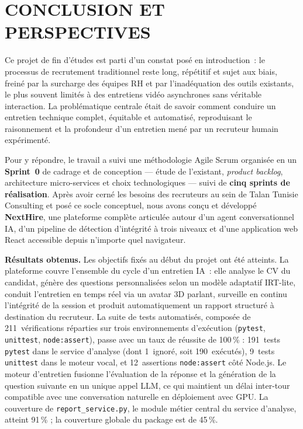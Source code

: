 \chapter*{CONCLUSION ET PERSPECTIVES}
\adjustmtc%
\thispagestyle{MyStyle}

Ce projet de fin d'études est parti d'un constat posé en introduction~: le processus de
recrutement traditionnel reste long, répétitif et sujet aux biais, freiné par la surcharge
des équipes RH et par l'inadéquation des outils existants, le plus souvent limités à des
entretiens vidéo asynchrones sans véritable interaction. La problématique centrale était de
savoir comment conduire un entretien technique complet, équitable et automatisé, reproduisant
le raisonnement et la profondeur d'un entretien mené par un recruteur humain expérimenté.

Pour y répondre, le travail a suivi une méthodologie Agile Scrum organisée en un \textbf{Sprint~0}
de cadrage et de conception --- étude de l'existant, \textit{product backlog}, architecture
micro-services et choix technologiques --- suivi de \textbf{cinq sprints de réalisation}. Après
avoir cerné les besoins des recruteurs au sein de Talan Tunisie Consulting et posé ce socle
conceptuel, nous avons conçu et développé \textbf{NextHire}, une plateforme complète articulée
autour d'un agent conversationnel IA, d'un pipeline de détection d'intégrité à trois niveaux et
d'une application web React accessible depuis n'importe quel navigateur.

\noindent\textbf{Résultats obtenus.}
Les objectifs fixés au début du projet ont été atteints. La plateforme couvre l'ensemble
du cycle d'un entretien IA~: elle analyse le CV du candidat, génère des questions
personnalisées selon un modèle adaptatif IRT-lite, conduit l'entretien en temps réel via
un avatar 3D parlant, surveille en continu l'intégrité de la session et produit
automatiquement un rapport structuré à destination du recruteur. La suite de tests automatisés, composée de 211~vérifications réparties sur trois
environnements d'exécution (\texttt{pytest}, \texttt{unittest}, \texttt{node:assert}),
passe avec un taux de réussite de 100\,\% :
191~tests \texttt{pytest} dans le service d'analyse (dont 1~ignoré, soit
190~exécutés), 9~tests \texttt{unittest} dans le moteur vocal,
et 12~assertions \texttt{node:assert} côté Node.js. Le moteur d'entretien fusionne l'évaluation
de la réponse et la génération de la question suivante en un unique appel LLM, ce qui maintient
un délai inter-tour compatible avec une conversation naturelle en déploiement avec GPU. La couverture de \texttt{report\_service.py}, le module métier central du service
d'analyse, atteint 91\,\% ; la couverture globale du package est de 45\,\%.

